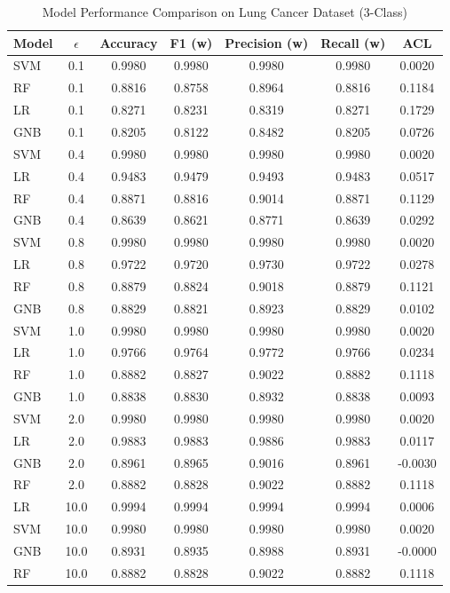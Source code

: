 \begin{table}[h]
\centering
\caption{Model Performance Comparison on Lung Cancer Dataset (3-Class)}
\label{tab:lung_cancer_comparison}
\begin{tabular}{lcccccc}
\hline
Model & $\epsilon$ & Accuracy & F1 (w) & Precision (w) & Recall (w) & ACL \\
\hline
SVM & 0.1 & 0.9980 & 0.9980 & 0.9980 & 0.9980 & 0.0020 \\
RF & 0.1 & 0.8816 & 0.8758 & 0.8964 & 0.8816 & 0.1184 \\
LR & 0.1 & 0.8271 & 0.8231 & 0.8319 & 0.8271 & 0.1729 \\
GNB & 0.1 & 0.8205 & 0.8122 & 0.8482 & 0.8205 & 0.0726 \\
\hline
SVM & 0.4 & 0.9980 & 0.9980 & 0.9980 & 0.9980 & 0.0020 \\
LR & 0.4 & 0.9483 & 0.9479 & 0.9493 & 0.9483 & 0.0517 \\
RF & 0.4 & 0.8871 & 0.8816 & 0.9014 & 0.8871 & 0.1129 \\
GNB & 0.4 & 0.8639 & 0.8621 & 0.8771 & 0.8639 & 0.0292 \\
\hline
SVM & 0.8 & 0.9980 & 0.9980 & 0.9980 & 0.9980 & 0.0020 \\
LR & 0.8 & 0.9722 & 0.9720 & 0.9730 & 0.9722 & 0.0278 \\
RF & 0.8 & 0.8879 & 0.8824 & 0.9018 & 0.8879 & 0.1121 \\
GNB & 0.8 & 0.8829 & 0.8821 & 0.8923 & 0.8829 & 0.0102 \\
\hline
SVM & 1.0 & 0.9980 & 0.9980 & 0.9980 & 0.9980 & 0.0020 \\
LR & 1.0 & 0.9766 & 0.9764 & 0.9772 & 0.9766 & 0.0234 \\
RF & 1.0 & 0.8882 & 0.8827 & 0.9022 & 0.8882 & 0.1118 \\
GNB & 1.0 & 0.8838 & 0.8830 & 0.8932 & 0.8838 & 0.0093 \\
\hline
SVM & 2.0 & 0.9980 & 0.9980 & 0.9980 & 0.9980 & 0.0020 \\
LR & 2.0 & 0.9883 & 0.9883 & 0.9886 & 0.9883 & 0.0117 \\
GNB & 2.0 & 0.8961 & 0.8965 & 0.9016 & 0.8961 & -0.0030 \\
RF & 2.0 & 0.8882 & 0.8828 & 0.9022 & 0.8882 & 0.1118 \\
\hline
LR & 10.0 & 0.9994 & 0.9994 & 0.9994 & 0.9994 & 0.0006 \\
SVM & 10.0 & 0.9980 & 0.9980 & 0.9980 & 0.9980 & 0.0020 \\
GNB & 10.0 & 0.8931 & 0.8935 & 0.8988 & 0.8931 & -0.0000 \\
RF & 10.0 & 0.8882 & 0.8828 & 0.9022 & 0.8882 & 0.1118 \\
\hline
\end{tabular}
\end{table}
